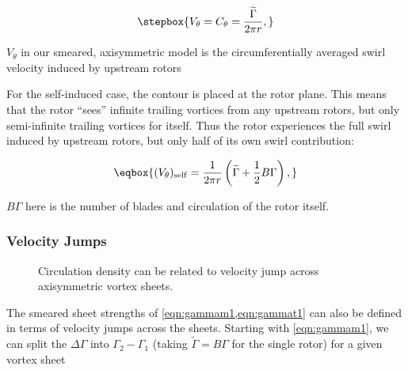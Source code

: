 \begin{equation}
    \label{eqn:vtheta}
    \stepbox{
    V_\theta = C_\theta = \frac{\widetilde{\Gamma}}{2 \pi r},
}
\end{equation}

\where \(V_\theta\) in our smeared, axisymmetric model is the circumferentially averaged swirl velocity induced by upstream rotors

For the self-induced case, the contour is placed at the rotor plane.
%
This means that the rotor ``sees'' infinite trailing vortices from any upstream rotors, but only semi-infinite trailing vortices for itself.
%
Thus the rotor experiences the full swirl induced by upstream rotors, but only half of its own swirl contribution:

\begin{equation}
    \label{eqn:vthetaself}
    \eqbox{
        (V_\theta)_\mathrm{self} = \frac{1}{2 \pi r} \left( \widetilde{\Gamma} + \frac{1}{2} B \Gamma \right),
    }
\end{equation}



\where \(B \Gamma\) here is the number of blades and circulation of the rotor itself.


\subsubsection{Velocity Jumps}

\begin{figure}[h!]
    \centering
    
    \caption{Circulation density can be related to velocity jump across axisymmetric vortex sheets.}
    \label{fig:velocityjump}
\end{figure}


The smeared sheet strengths of \cref{eqn:gammam1,eqn:gammat1} can also be defined in terms of velocity jumps across the sheets.
Starting with \cref{eqn:gammam1}, we can split the \(\Delta\Gamma\) into \(\Gamma_2 - \Gamma_1\) (taking \(\widetilde{\Gamma} = B\Gamma\) for the single rotor) for a given vortex sheet

